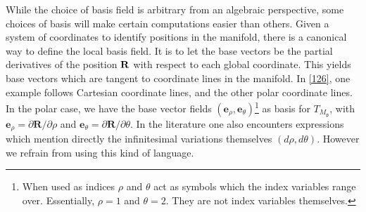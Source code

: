 \documentclass[nolinenum]{jfp}
\begin{document}
While the choice of basis field is arbitrary from an algebraic
perspective, some choices of basis will make certain computations
easier than others. Given a system of coordinates to identify
positions in the manifold, there is a canonical way to define the
local basis field. It is to let the base vectors be the partial
derivatives of the position \(\bf R\) with respect to each
global coordinate.  This yields base vectors which are tangent to coordinate
lines in the manifold.  In \cref{126}, one example follows Cartesian
coordinate lines, and the other polar coordinate lines. In the polar
case, we have the base vector fields \((\mathbf e_ρ, \mathbf
e_θ)\)\footnote{When used as indices \(ρ\) and \(θ\) act as
symbols which the index variables range over. Essentially, \(ρ=1\) and \(θ=2\). They are not index variables themselves.} as basis for
\(T_{M_{\mathsf{p}}}\), with \(\mathbf e_ρ = \partial \mathbf R / \partial ρ\) and \(\mathbf e_θ = \partial \mathbf R / \partial θ\). In the literature one also
encounters expressions which mention directly the infinitesimal variations themselves
\((dρ,dθ)\). However we refrain from using this kind of language.
\end{document}

